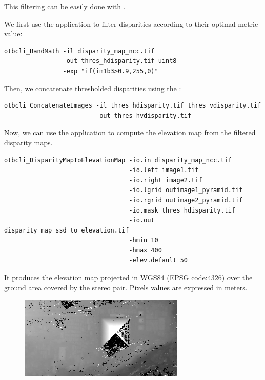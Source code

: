 This filtering can be easily done with \app.

We first use the  application to filter
disparities according to their optimal metric value:

\begin{verbatim}
otbcli_BandMath -il disparity_map_ncc.tif
                -out thres_hdisparity.tif uint8
                -exp "if(im1b3>0.9,255,0)"
\end{verbatim}

Then, we concatenate thresholded disparities using the :

\begin{verbatim}
otbcli_ConcatenateImages -il thres_hdisparity.tif thres_vdisparity.tif
                         -out thres_hvdisparity.tif
\end{verbatim}

Now, we can use the  application to
compute the elevation map from the filtered disparity maps.

\begin{verbatim}
otbcli_DisparityMapToElevationMap -io.in disparity_map_ncc.tif
                                  -io.left image1.tif
                                  -io.right image2.tif
                                  -io.lgrid outimage1_pyramid.tif
                                  -io.rgrid outimage2_pyramid.tif
                                  -io.mask thres_hdisparity.tif
                                  -io.out disparity_map_ssd_to_elevation.tif
                                  -hmin 10
                                  -hmax 400
                                  -elev.default 50
\end{verbatim}

It produces the elevation map projected in WGS84 (EPSG code:$4326$) over the
ground area covered by the stereo pair. Pixels values are expressed in meters.

\begin{figure}[!h]
  \center
  \includegraphics[width=0.7\textwidth]{../Art/MonteverdiImages/stereo_dem_zoom.png}
  \label{fig:stereo_out}
\end{figure}

